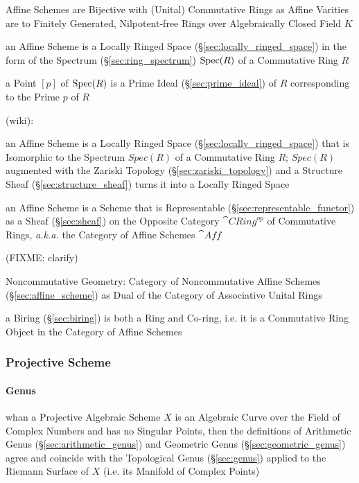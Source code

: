Affine Schemes are Bijective with (Unital) Commutative Rings as Affine Varities
are to Finitely Generated, Nilpotent-free Rings over Algebraically Closed Field
$K$

an Affine Scheme is a Locally Ringed Space (\S\ref{sec:locally_ringed_space}) in
the form of the Spectrum (\S\ref{sec:ring_spectrum}) $\mathrm{Spec}(R)$ of a Commutative
Ring $R$

a Point $[p]$ of $\mathrm{Spec}(R)$ is a Prime Ideal (\S\ref{sec:prime_ideal}) of $R$
corresponding to the Prime $p$ of $R$

(wiki):

an Affine Scheme is a Locally Ringed Space (\S\ref{sec:locally_ringed_space})
that is Isomorphic to the Spectrum $Spec(R)$ of a Commutative Ring $R$;
$Spec(R)$ augmented with the Zariski Topology (\S\ref{sec:zariski_topology}) and
a Structure Sheaf (\S\ref{sec:structure_sheaf}) turns it into a Locally Ringed
Space

an Affine Scheme is a Scheme that is Representable
(\S\ref{sec:representable_functor}) as a Sheaf (\S\ref{sec:sheaf}) on the
Opposite Category $\cat{CRing}^{op}$ of Commutative Rings, \emph{a.k.a.} the
Category of Affine Schemes $\cat{Aff}$

(FIXME: clarify)

Noncommutative Geometry: Category of Noncommutative Affine Schemes
(\S\ref{sec:affine_scheme}) as Dual of the Category of Associative Unital Rings

a Biring (\S\ref{sec:biring}) is both a Ring and Co-ring, i.e. it is a
Commutative Ring Object in the Category of Affine Schemes



\subsubsection{Projective Scheme}\label{sec:projective_scheme}

\paragraph{Genus}\label{sec:scheme_genus}\hfill

whan a Projective Algebraic Scheme $X$ is an Algebraic Curve over the Field of
Complex Numbers and has no Singular Points, then the definitions of Arithmetic
Genus (\S\ref{sec:arithmetic_genus}) and Geometric Genus
(\S\ref{sec:geometric_genus}) agree and coincide with the Topological Genus
(\S\ref{sec:genus}) applied to the Riemann Surface of $X$ (i.e. its Manifold of
Complex Points)

